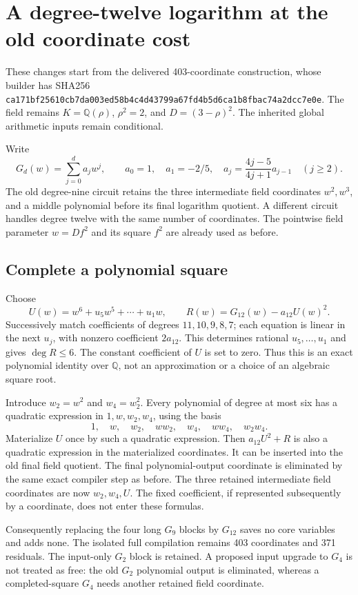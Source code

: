 \section{A degree-twelve logarithm at the old coordinate cost}

These changes start from the delivered 403-coordinate construction, whose
builder has SHA256
\texttt{ca171bf25610cb7da003ed58b4c4d43799a67fd4b5d6ca1b8fbac74a2dcc7e0e}.
The field remains $K=\mathbb Q(\rho)$, $\rho^2=2$, and
$D=(3-\rho)^2$. The inherited global arithmetic inputs remain conditional.

Write
\[
 G_d(w)=\sum_{j=0}^d a_jw^j,\qquad
 a_0=1,\quad a_1=-2/5,\quad
 a_j=\frac{4j-5}{4j+1}a_{j-1}\quad(j\ge2).
\]
The old degree-nine circuit retains the three intermediate field
coordinates $w^2,w^3$, and a middle polynomial before its final logarithm
quotient. A different circuit handles degree twelve with the same number
of coordinates. The pointwise field parameter $w=Df^2$ and its square
$f^2$ are already used as before.

\subsection{Complete a polynomial square}

Choose
\[
 U(w)=w^6+u_5w^5+\cdots+u_1w,\qquad
 R(w)=G_{12}(w)-a_{12}U(w)^2.
\]
Successively match coefficients of degrees $11,10,9,8,7$; each equation
is linear in the next $u_j$, with nonzero coefficient $2a_{12}$.
This determines rational $u_5,\ldots,u_1$ and gives $\deg R\le6$.
The constant coefficient of $U$ is set to zero. Thus this is an exact
polynomial identity over $\mathbb Q$, not an approximation or a choice
of an algebraic square root.

Introduce $w_2=w^2$ and $w_4=w_2^2$. Every polynomial of degree at most
six has a quadratic expression in $1,w,w_2,w_4$, using the basis
\[
 1,\quad w,\quad w_2,\quad ww_2,\quad w_4,
 \quad ww_4,\quad w_2w_4.
\]
Materialize $U$ once by such a quadratic expression. Then
$a_{12}U^2+R$ is also a quadratic expression in the materialized
coordinates. It can be inserted into the old final field quotient.
The final polynomial-output coordinate is eliminated by the same exact
compiler step as before. The three retained intermediate field
coordinates are now $w_2,w_4,U$. The fixed coefficient, if represented
subsequently by a coordinate, does not enter these formulas.

Consequently replacing the four long $G_9$ blocks by $G_{12}$ saves no
core variables and adds none. The isolated full compilation remains
403 coordinates and 371 residuals. The input-only $G_2$ block is retained.
A proposed input upgrade to $G_4$ is not treated as free: the old $G_2$
polynomial output is eliminated, whereas a completed-square $G_4$ needs
another retained field coordinate.

